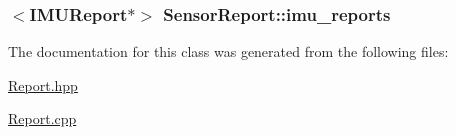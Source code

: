 \subsubsection[{\texorpdfstring{imu\+\_\+reports}{imu_reports}}]{$<${\bf I\+M\+U\+Report}$\ast$$>$ Sensor\+Report\+::imu\+\_\+reports}\hypertarget{classSensorReport_ae2f1fcae2d8ec5763364eb47ae22d810}{}\label{classSensorReport_ae2f1fcae2d8ec5763364eb47ae22d810}


The documentation for this class was generated from the following files\+:\begin{DoxyCompactItemize}
\item 
\hyperlink{Report_8hpp}{Report.\+hpp}\item 
\hyperlink{Report_8cpp}{Report.\+cpp}\end{DoxyCompactItemize}
